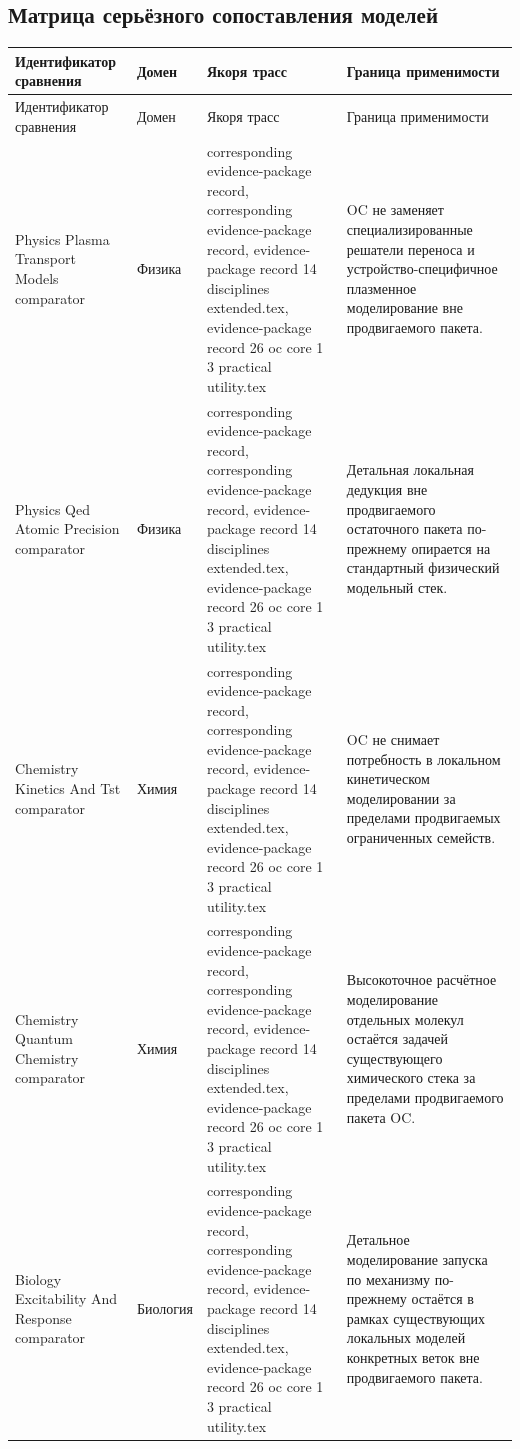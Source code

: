 \subsection{Матрица серьёзного сопоставления моделей}
\begin{longtable}{@{}L{0.20\textwidth}L{0.11\textwidth}L{0.33\textwidth}L{0.28\textwidth}@{}}
\toprule
Идентификатор сравнения & Домен & Якоря трасс & Граница применимости \\
\midrule
\endfirsthead
\toprule
Идентификатор сравнения & Домен & Якоря трасс & Граница применимости \\
\midrule
\endhead
Physics Plasma Transport Models comparator & Физика & corresponding evidence-package record, corresponding evidence-package record, \allowbreak evidence-package record 14 disciplines extended.tex, \allowbreak evidence-package record 26 oc core 1 3 practical utility.tex & OC не заменяет специализированные решатели переноса и устройство-специфичное плазменное моделирование вне продвигаемого пакета. \\
Physics Qed Atomic Precision comparator & Физика & corresponding evidence-package record, corresponding evidence-package record, \allowbreak evidence-package record 14 disciplines extended.tex, \allowbreak evidence-package record 26 oc core 1 3 practical utility.tex & Детальная локальная дедукция вне продвигаемого остаточного пакета по-прежнему опирается на стандартный физический модельный стек. \\
Chemistry Kinetics And Tst comparator & Химия & corresponding evidence-package record, corresponding evidence-package record, \allowbreak evidence-package record 14 disciplines extended.tex, \allowbreak evidence-package record 26 oc core 1 3 practical utility.tex & OC не снимает потребность в локальном кинетическом моделировании за пределами продвигаемых ограниченных семейств. \\
Chemistry Quantum Chemistry comparator & Химия & corresponding evidence-package record, corresponding evidence-package record, \allowbreak evidence-package record 14 disciplines extended.tex, \allowbreak evidence-package record 26 oc core 1 3 practical utility.tex & Высокоточное расчётное моделирование отдельных молекул остаётся задачей существующего химического стека за пределами продвигаемого пакета OC. \\
Biology Excitability And Response comparator & Биология & corresponding evidence-package record, corresponding evidence-package record, \allowbreak evidence-package record 14 disciplines extended.tex, \allowbreak evidence-package record 26 oc core 1 3 practical utility.tex & Детальное моделирование запуска по механизму по-прежнему остаётся в рамках существующих локальных моделей конкретных веток вне продвигаемого пакета. \\

\end{longtable}
